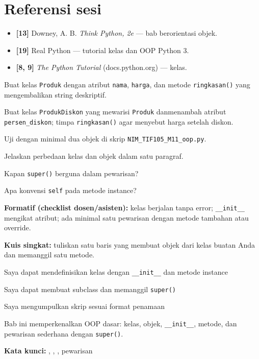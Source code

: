 \documentclass[../main.tex]{subfiles}
\begin{document}
\section{Referensi sesi}

\begin{itemize}[leftmargin=*]
  \item \textbf{[13]} Downey, A. B. \textit{Think Python, 2e} --- bab berorientasi objek.
  \item \textbf{[19]} Real Python --- tutorial kelas dan OOP Python 3.
  \item \textbf{[8, 9]} \textit{The Python Tutorial} (docs.python.org) --- kelas.
\end{itemize}

\begin{aktivitas}
  \item Buat kelas \texttt{Produk} dengan atribut \texttt{nama}, \texttt{harga}, dan metode \texttt{ringkasan()} yang mengembalikan string deskriptif.
  \item Buat kelas \texttt{ProdukDiskon} yang mewarisi \texttt{Produk} dan\newline menambah atribut \texttt{persen\_diskon}; timpa \texttt{ringkasan()} agar menyebut harga setelah diskon.
  \item Uji dengan minimal dua objek di skrip \texttt{NIM\_TIF105\_M11\_oop.py}.
\end{aktivitas}

\begin{latihan}
  \item Jelaskan perbedaan kelas dan objek dalam satu paragraf.
  \item Kapan \texttt{super()} berguna dalam pewarisan?
  \item Apa konvensi \texttt{self} pada metode instance?
\end{latihan}

\begin{asesmen}
\textbf{Formatif (checklist dosen/asisten):} kelas berjalan tanpa error; \texttt{\_\_init\_\_} mengikat atribut; ada minimal satu pewarisan dengan metode tambahan atau override.

\textbf{Kuis singkat:} tuliskan satu baris yang membuat objek dari kelas buatan Anda dan memanggil satu metode.
\end{asesmen}

\begin{checklist}
  \item Saya dapat mendefinisikan kelas dengan \texttt{\_\_init\_\_} dan metode instance
  \item Saya dapat membuat subclass dan memanggil \texttt{super()}
  \item Saya mengumpulkan skrip sesuai format penamaan
\end{checklist}

\begin{rangkuman}
Bab ini memperkenalkan OOP dasar: kelas, objek, \texttt{\_\_init\_\_}, metode, dan pewarisan sederhana dengan \texttt{super()}.

\textbf{Kata kunci:} , , , pewarisan
\end{rangkuman}
\end{document}
